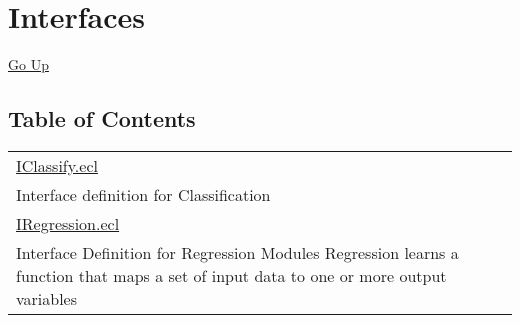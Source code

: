 \chapter*{\color{headtoc} Interfaces}
\hypertarget{ecldoc:toc:root/ML_Core/Interfaces}{}
\hyperlink{ecldoc:toc:root/ML_Core}{Go Up}


\section*{Table of Contents}
{\renewcommand{\arraystretch}{1.5}
\begin{longtable}{|p{\textwidth}|}
\hline
\hyperlink{ecldoc:toc:ML_Core.Interfaces.IClassify}{IClassify.ecl} \\
Interface definition for Classification \\
\hline
\hyperlink{ecldoc:toc:ML_Core.Interfaces.IRegression}{IRegression.ecl} \\
Interface Definition for Regression Modules Regression learns a function that maps a set of input data to one or more output variables \\
\hline
\end{longtable}
}




